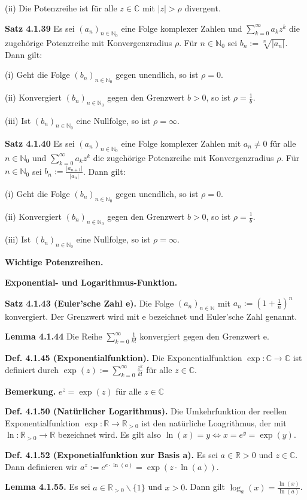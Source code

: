 (ii) Die Potenzreihe ist für alle $z\in \mathbb C$ mit $\vert z \vert > \rho$ divergent.

\textbf{Satz 4.1.39} Es sei $(a_n)_{n \in \mathbb N_0}$ eine Folge komplexer Zahlen und $\sum_{k=0}^\infty a_k z^k$ die zugehörige Potenzreihe mit Konvergenzradius $\rho$. Für $n \in \mathbb N_0$ sei $b_n := \sqrt[n]{\vert a_n \vert}$. Dann gilt:

(i) Geht die Folge $(b_n)_{n \in \mathbb N_0}$ gegen unendlich, so ist $\rho = 0$.

(ii) Konvergiert $(b_n)_{n \in \mathbb N_0}$ gegen den Grenzwert $b > 0$, so ist $\rho = \frac{1}{b}$.

(iii) Ist $(b_n)_{n \in \mathbb N_0}$ eine Nullfolge, so ist $\rho = \infty$.

\textbf{Satz 4.1.40} Es sei $(a_n)_{n \in \mathbb N_0}$ eine Folge komplexer Zahlen mit $a_n \neq 0$ für alle $n \in \mathbb N_0$ und $\sum_{k=0}^\infty a_k z^k$ die zugehörige Potenzreihe mit Konvergenzradius $\rho$. Für $n \in \mathbb N_0$ sei $b_n := \frac{\vert a_{n+1} \vert }{\vert a_n \vert}$. Dann gilt:

(i) Geht die Folge $(b_n)_{n \in \mathbb N_0}$ gegen unendlich, so ist $\rho = 0$.

(ii) Konvergiert $(b_n)_{n \in \mathbb N_0}$ gegen den Grenzwert $b > 0$, so ist $\rho = \frac{1}{b}$.

(iii) Ist $(b_n)_{n \in \mathbb N_0}$ eine Nullfolge, so ist $\rho = \infty$.

\textbf{Wichtige Potenzreihen.}

\textbf{Exponential- und Logarithmus-Funktion.}

\textbf{Satz 4.1.43 (Euler’sche Zahl e).} Die Folge $(a_n)_{n \in \mathbb N}$ mit $a_n := (1+\frac{1}{n})^n$ konvergiert. Der Grenzwert wird mit e bezeichnet und Euler’sche Zahl genannt.

\textbf{Lemma 4.1.44} Die Reihe $\sum_{k=0}^\infty \frac{1}{k!}$ konvergiert gegen den Grenzwert e.

\textbf{Def. 4.1.45 (Exponentialfunktion).} Die Exponentialfunktion $\exp : \mathbb C \rightarrow \mathbb C$ ist definiert durch $\exp (z) :=  \sum_{k=0}^\infty \frac{z^k}{k!}$ für alle $z \in \mathbb C$.

\textbf{Bemerkung.} $e^z = \exp (z)$ für alle $z \in \mathbb C$

\textbf{Def. 4.1.50 (Natürlicher Logarithmus).} Die  Umkehrfunktion der reellen Exponentialfunktion $\exp : \mathbb R \rightarrow \mathbb R_{>0}$ ist den natürliche Loagrithmus, der mit $\ln : \mathbb R_{>0} \rightarrow \mathbb R$ bezeichnet wird. Es gilt also $\ln(x) = y \Leftrightarrow x = e^y = \exp(y)$.

\textbf{Def. 4.1.52 (Exponetialfunktion zur Basis a).} Es sei $a\in \mathbb R>0$ und $z \in \mathbb C$. Dann definieren wir $a^z := e^{e\cdot \ln(a)} = \exp(z\cdot \ln(a))$.

\textbf{Lemma 4.1.55.} Es sei $a \in \mathbb R_{>0} \backslash \{1\}$ und $x > 0$. Dann gilt $\log_a(x) = \frac{\ln(x)}{\ln(a)}$.

